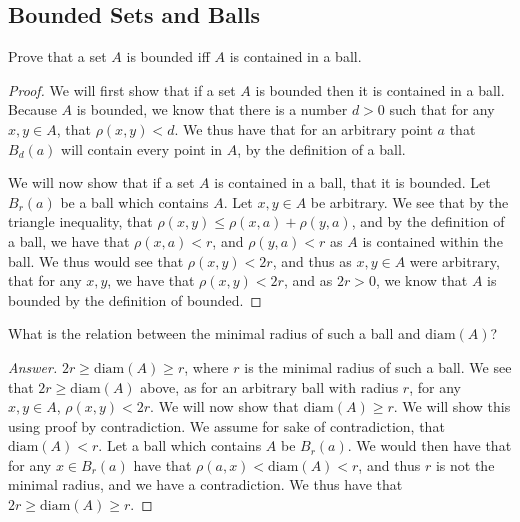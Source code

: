 \subsection{Bounded Sets and Balls}

\begin{majorEx}%
    Prove that a set $A$ is bounded iff $A$ is contained in a ball.
\end{majorEx}

\begin{proof}
  We will first show that if a set $A$ is bounded then it is contained
  in a ball. Because $A$ is bounded, we know that there is a number
  $d>0$ such that for any $x,y \in A$, that $\rho(x,y)<d$. We thus
  have that for an arbitrary point $a$ that $B_d(a)$ will contain
  every point in $A$, by the definition of a ball.

  We will now show that if a set $A$ is contained in a ball, that it
  is bounded. Let $B_r(a)$ be a ball which contains $A$. Let $x,y\in
  A$ be arbitrary. We see that by the triangle inequality, that 
  $\rho(x,y)\leq \rho(x,a) + \rho(y,a)$, and by the definition of a
  ball, we have that $\rho(x,a)<r$, and  $\rho(y,a)<r$ as $A$ is
  contained within the ball. We thus would see that  $\rho(x,y)< 2r$,
  and thus as $x,y\in A$ were arbitrary, that  for any $x,y$, we have
  that $\rho(x,y)< 2r$, and as $2r>0$, we know that $A$ is bounded by
  the definition of bounded.
\end{proof}


\begin{minorEx}%
    What is the relation between the minimal radius of such a ball and
    $\mathrm{diam}(A)$?
\end{minorEx}

\begin{proof}[Answer]
  $2r\geq \mathrm{diam}(A) \geq r$, where $r$ is the minimal radius of such a
  ball. We see that $2r\geq \mathrm{diam}(A)$ above, as for an
  arbitrary ball with radius $r$, for any $x,y\in A$,
  $\rho(x,y)<2r$. We will now show that $\mathrm{diam}(A) \geq r$.
  We will show this using proof by contradiction. We assume for
  sake of contradiction, that  $\mathrm{diam}(A) < r$. Let a ball
  which contains $A$ be $B_r(a)$. We would then have that for any $x\in B_r(a)$
  have that $\rho(a,x)<\mathrm{diam}(A)<r$, and thus $r$ is not the
  minimal radius, and we have a contradiction. 
  We thus have that $2r\geq \mathrm{diam}(A) \geq r$.
\end{proof}

